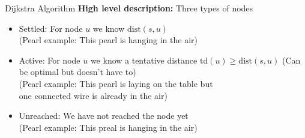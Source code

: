 \begin{frame}{Dijkstra Algorithm}
  \textbf{High level description:}
  Three types of nodes
  \begin{itemize}
    \item
      {\color{MainA}Settled:}
      For node {\color{MainA}$u$} we know
      {\color{MainA}$\mathrm{dist}(s, u)$}
      \hfill
      \\
      {\color{gray}(Pearl example: This pearl is hanging in the air)}
      \vspace{0.5em}
    \item
      {\color{MainA}Active:}
      For node {\color{MainA}$u$} we know a tentative distance
      {\color{MainA}$\mathrm{td}(u) \geq \mathrm{dist}(s, u)$}
      (Can be optimal but doesn't have to)
      \hfill
      \\
      {\color{gray}(Pearl example: This pearl is laying on the table but\\
        one connected wire is already in the air)}
        \vspace{0.5em}
    \item
      {\color{MainA}Unreached:}
      We have not reached the node yet
      \hfill
      \\
        {\color{gray}(Pearl example: This preal is hanging in the air)}
  \end{itemize}
\end{frame}


